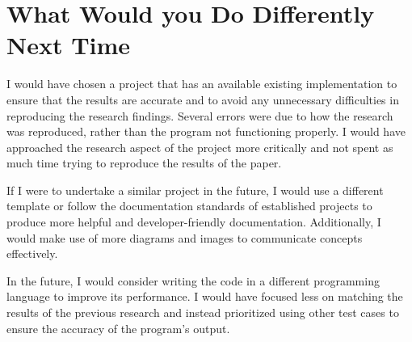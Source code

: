 \documentclass{article}
\begin{document}
\section{What Would you Do Differently Next Time}

I would have chosen a project that has an available existing implementation to ensure that the results are accurate and to avoid any unnecessary difficulties in reproducing the research findings.
Several errors were due to how the research was reproduced, rather than the program not functioning properly.
I would have approached the research aspect of the project more critically and not spent as much time trying to reproduce the results of the paper.

If I were to undertake a similar project in the future, I would use a different template or follow the documentation standards of established projects to produce more helpful and developer-friendly documentation.
Additionally, I would make use of more diagrams and images to communicate concepts effectively.

In the future, I would consider writing the code in a different programming language to improve its performance.
I would have focused less on matching the results of the previous research \cite{zighed_statistical_2005} and instead prioritized using other test cases to ensure the accuracy of the program's output.

\newpage
{}
{}


\end{document}
